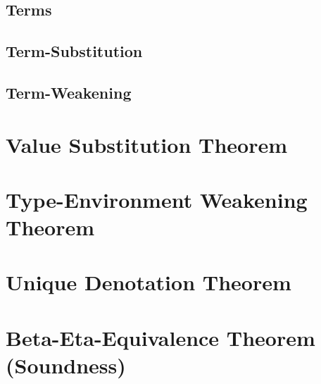 \documentclass{report}
\begin{document}
\section{Terms}
\effectWeakeningTerms

\section{Term-Substitution}
\effectWeakeningTermSubstitution

\section{Term-Weakening}
\effectWeakeningTermWeakening

\chapter{Value Substitution Theorem}
\termSubstitution

\chapter{Type-Environment Weakening Theorem}
\termWeakening
    
\chapter{Unique Denotation Theorem}

\reductionExistence
\reductionDefinition

\chapter{Beta-Eta-Equivalence Theorem (Soundness)}
\soundnessproof
    
\end{document}

